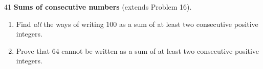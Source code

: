 
\begin{probbox}{41}{}
\textbf{Sums of consecutive numbers} (extends Problem 16).
\begin{enumerate}[label=\alph*),leftmargin=1.6em,itemsep=1pt]
\item Find \emph{all} the ways of writing $100$ as a sum of at least two consecutive positive integers.
\item Prove that $64$ cannot be written as a sum of at least two consecutive positive integers.
\end{enumerate}
\end{probbox}
